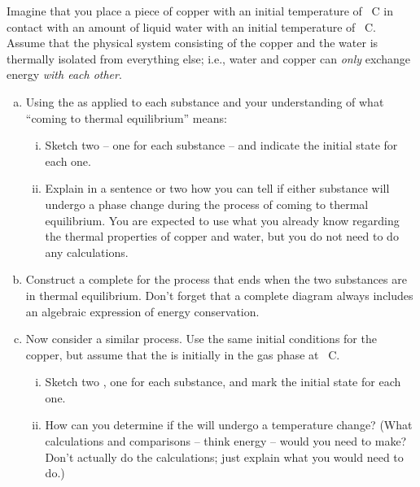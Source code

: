 \label{fnt1.1.3-6}

Imagine that you place a piece of copper with an initial temperature of \unit[20]{\textdegree C} in contact with an amount of liquid water with an initial temperature of \unit[100]{\textdegree C}. Assume that the physical system consisting of the copper and the water is thermally isolated from everything else; i.e., water and copper can \emph{only} exchange energy \emph{with each other}.

\begin{enumerate}[(a)]
	\item Using the \ThreePhaseModel{} as applied to each substance and your understanding of what ``coming to thermal equilibrium'' means:
	
	\begin{enumerate}[i.]
		\item Sketch two \TempGraphs{} -- one for each substance -- and indicate the initial state for each one.
		\item Explain in a sentence or two how you can tell if either substance will undergo a phase change during the process of coming to thermal equilibrium. You are expected to use what you already know regarding the thermal properties of copper and water, but you do not need to do any calculations.
	\end{enumerate}
	
	\item Construct a complete \EnergyDiagram{} for the process that ends when the two substances are in thermal equilibrium. Don't forget that a complete diagram always includes an algebraic expression of energy conservation.
	
	\item Now consider a similar process. Use the same initial conditions for the copper, but assume that the  is initially in the gas phase at \unit[100]{\textdegree C}.
	\begin{enumerate}[i.]
		\item Sketch two \TempGraphs{}, one for each substance, and mark the initial state for each one.
		\item How can you determine if the  will undergo a temperature change? (What calculations and comparisons -- think energy -- would you need to make?  Don't actually do the calculations; just explain what you would need to do.)
	\end{enumerate}
\end{enumerate}